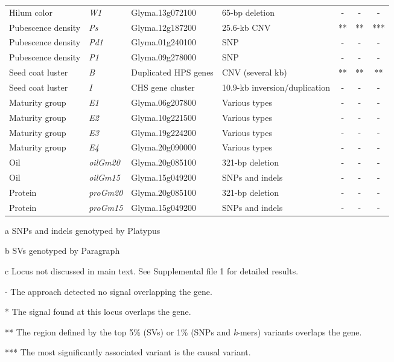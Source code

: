 \documentclass{article}
\begin{document}
\begin{landscape}
\begin{table}
\begin{threeparttable}
\begin{tabular}{llllccc}
		Hilum color\tnote{c} & \textit{W1} & Glyma.13g072100 & 65-bp deletion \shortcite{zabala2007} & - & - & - \\
		Pubescence density & \textit{Ps} & Glyma.12g187200 & 25.6-kb CNV \shortcite{liu2020ps} & ** & ** & *** \\
		Pubescence density\tnote{c} & \textit{Pd1} & Glyma.01g240100 & SNP \shortcite{liu2020ps} & - & - & - \\
		Pubescence density\tnote{c} & \textit{P1} & Glyma.09g278000 & SNP \shortcite{liu2020ps} & - & - & - \\
		Seed coat luster & \textit{B} & Duplicated HPS genes & CNV (several kb) \shortcite{gijzen2006} & ** & ** & ** \\
		Seed coat luster\tnote{c} & \textit{I} & CHS gene cluster & 10.9-kb inversion/duplication \shortcite{tuteja2008} & - & - & - \\
		Maturity group\tnote{c} & \textit{E1} & Glyma.06g207800 & Various types \shortcite{tardivel2019} & - & - & - \\
		Maturity group\tnote{c} & \textit{E2} & Glyma.10g221500 & Various types \shortcite{tardivel2019} & - & - & - \\
		Maturity group\tnote{c} & \textit{E3} & Glyma.19g224200 & Various types \shortcite{tardivel2019} & - & - & - \\
		Maturity group\tnote{c} & \textit{E4} & Glyma.20g090000 & Various types \shortcite{tardivel2019} & - & - & - \\
		Oil\tnote{c} & \textit{oilGm20} & Glyma.20g085100 & 321-bp deletion \shortcite{fliege2022} & - & - & - \\
		Oil\tnote{c} & \textit{oilGm15} & Glyma.15g049200 & SNPs and indels \shortcite{zhang2020} & - & - & - \\
		Protein\tnote{c} & \textit{proGm20} & Glyma.20g085100 & 321-bp deletion \shortcite{fliege2022} & - & - & - \\
		Protein\tnote{c} & \textit{proGm15} & Glyma.15g049200 & SNPs and indels \shortcite{zhang2020} & - & - & - \\
		\bottomrule
		\end{tabular}

		\begin{tablenotes}
		\item[a] SNPs and indels genotyped by Platypus
		\item[b] SVs genotyped by Paragraph
		\item[c] Locus not discussed in main text. See Supplemental file 1 for detailed results.
		\item[]- The approach detected no signal overlapping the gene.
		\item[]* The signal found at this locus overlaps the gene.
		\item[]** The region defined by the top 5\% (SVs) or 1\% (SNPs and \textit{k}-mers) variants overlaps the gene.
		\item[]*** The most significantly associated variant is the causal variant.
		\end{tablenotes}


\end{threeparttable}
\end{table}
\end{landscape}
\end{document}
